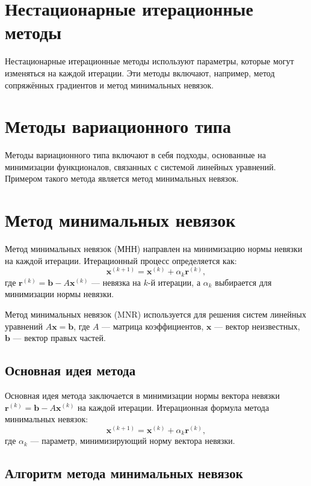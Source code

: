 \documentclass{article}
\begin{document}
\section{Нестационарные итерационные методы}
Нестационарные итерационные методы используют параметры, которые могут изменяться на каждой итерации. Эти методы включают, например, метод сопряжённых градиентов и метод минимальных невязок.

\section{Методы вариационного типа}
Методы вариационного типа включают в себя подходы, основанные на минимизации функционалов, связанных с системой линейных уравнений. Примером такого метода является метод минимальных невязок.

\section{Метод минимальных невязок}
Метод минимальных невязок (МНН) направлен на минимизацию нормы невязки на каждой итерации. Итерационный процесс определяется как:
\[
\mathbf{x}^{(k+1)} = \mathbf{x}^{(k)} + \alpha_k \mathbf{r}^{(k)},
\]
где $\mathbf{r}^{(k)} = \mathbf{b} - A\mathbf{x}^{(k)}$ — невязка на $k$-й итерации, а $\alpha_k$ выбирается для минимизации нормы невязки.

Метод минимальных невязок (MNR) используется для решения систем линейных уравнений \(A\mathbf{x} = \mathbf{b}\), где \(A\) — матрица коэффициентов, \(\mathbf{x}\) — вектор неизвестных, \(\mathbf{b}\) — вектор правых частей.

\subsection*{Основная идея метода}

Основная идея метода заключается в минимизации нормы вектора невязки \(\mathbf{r}^{(k)} = \mathbf{b} - A\mathbf{x}^{(k)}\) на каждой итерации. Итерационная формула метода минимальных невязок:
\[
\mathbf{x}^{(k+1)} = \mathbf{x}^{(k)} + \alpha_k \mathbf{r}^{(k)},
\]
где \(\alpha_k\) — параметр, минимизирующий норму вектора невязки.

\subsection*{Алгоритм метода минимальных невязок}
\end{document}
